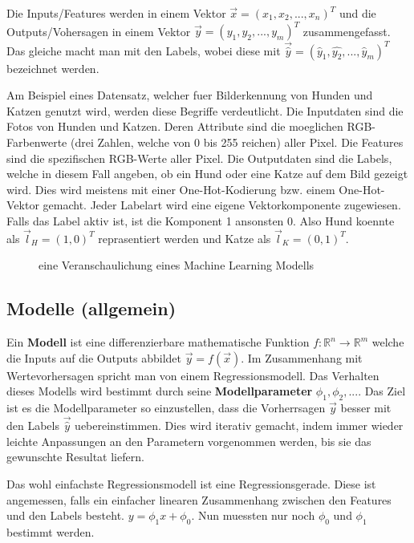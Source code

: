 \documentclass[../main]{subfiles}
\begin{document}
Die Inputs/Features werden in einem Vektor $\vec{x}=(x_1,x_2,...,x_n)^T$ und die Outputs/Vohersagen in einem Vektor $\vec{y}=(y_1,y_2,...,y_m)^T$ zusammengefasst.
Das gleiche macht man mit den Labels, wobei diese mit $\vec{\hat{y}}=(\hat{y}_1,\hat{y_2},...,\hat{y}_m)^T$ bezeichnet werden.
\par \medskip
Am Beispiel eines Datensatz, welcher fuer Bilderkennung von Hunden und Katzen genutzt wird, werden diese Begriffe verdeutlicht.
Die Inputdaten sind die Fotos von Hunden und Katzen. Deren Attribute sind die moeglichen RGB-Farbenwerte (drei Zahlen, welche von 0 bis 255 reichen) aller Pixel.
Die Features sind die spezifischen RGB-Werte aller Pixel. Die Outputdaten sind die Labels, welche in diesem Fall angeben, ob ein Hund oder eine Katze auf dem Bild gezeigt wird.
Dies wird meistens mit einer One-Hot-Kodierung bzw. einem One-Hot-Vektor gemacht. Jeder Labelart wird eine eigene Vektorkomponente zugewiesen. Falls das Label aktiv ist, ist die Komponent 1 ansonsten 0. Also Hund koennte als $\vec{l}_H=(1,0)^T$ reprasentiert werden und Katze als $\vec{l}_K=(0,1)^T$.

\begin{figure}[h!]
    \centering
    \begin{tikzpicture}[node distance=5cm,auto]
        
    \end{tikzpicture}
    
    \caption{eine Veranschaulichung eines Machine Learning Modells}
\end{figure}

\subsection{Modelle (allgemein)}
Ein \textbf{Modell} ist eine differenzierbare mathematische Funktion $\mathit{f}\colon \mathbb{R}^n \to \mathbb{R}^m$ welche die Inputs auf die Outputs abbildet $\vec{y}=\mathit{f}(\vec{x})$.
Im Zusammenhang mit Wertevorhersagen spricht man von einem Regressionsmodell.
Das Verhalten dieses Modells wird bestimmt durch seine \textbf{Modellparameter} $\phi_1, \phi_2, ...$.
Das Ziel ist es die Modellparameter so einzustellen, dass die Vorherrsagen $\vec{y}$ besser mit den Labels $\vec{\hat{y}}$ uebereinstimmen.
Dies wird iterativ gemacht, indem immer wieder leichte Anpassungen an den Parametern vorgenommen werden, bis sie das gewunschte Resultat liefern. 

Das wohl einfachste Regressionsmodell ist eine Regressionsgerade. Diese ist angemessen, falls ein einfacher linearen Zusammenhang zwischen den Features und den Labels besteht.
$y=\phi_1x + \phi_0$. Nun muessten nur noch $\phi_0$ und $\phi_1$ bestimmt werden. 
\end{document}
